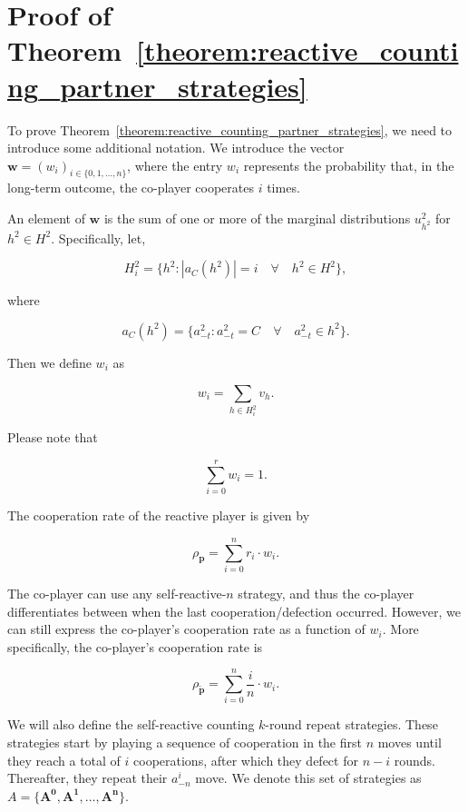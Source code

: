 \documentclass[11pt]{article}
\theoremstyle{plainCl1}
\theoremstyle{plainCl2}
\begin{document}

\section{Proof of Theorem~\ref{theorem:reactive_counting_partner_strategies}}\label{appendix:reactive_counting_n_akin_generalized}


To prove Theorem~\ref{theorem:reactive_counting_partner_strategies}, we need
to introduce some additional notation. We introduce the vector $\mathbf{w} =
(w_i)_{i \in \{0, 1, \dots, n\}}$, where the entry $w_i$ represents the
probability that, in the long-term outcome, the co-player cooperates $i$ times.

An element of $\mathbf{w}$ is the sum of one or more of the marginal
distributions $u^2_{h^2}$ for $h^2 \in H^2$. Specifically, let,

$$
H^2_{i} = \{h^2 : |a_{C}(h^2)| = i \quad \forall \quad h^2 \in H^2\},
$$

where

$$
a_{C}(h^2) = \{a^2_{-t} : a^2_{-t} = C \quad \forall \quad a^2_{-t} \in h^2\}.
$$

Then we define $w_i$ as

$$
w_{i} = \sum_{h \in H^2_{i}} v_{h}.
$$

Please note that

\begin{equation}\label{Eq:normalization_counting}
  \sum_{i=0}^{r} w_i = 1.
\end{equation}

The cooperation rate of the reactive player is given by

\begin{equation}\label{Eq:player_cooperation_counting}
  \rho_{\mathbf{p}} = \sum_{i=0}^{n} r_{i} \cdot w_{i}.
\end{equation}

The co-player can use any self-reactive-$n$ strategy, and thus the co-player
differentiates between when the last cooperation/defection occurred. However, we
can still express the co-player's cooperation rate as a function of $w_{i}$.
More specifically, the co-player's cooperation rate is

\begin{equation}\label{Eq:coplayer_cooperation_counting}
  \rho_{\mathbf{\tilde{p}}} = \sum_{i=0}^{n} \frac{i}{n} \cdot w_{i}.
\end{equation}

We will also define the self-reactive counting $k$-round repeat strategies.
These strategies start by playing a sequence of cooperation in the first $n$
moves until they reach a total of $i$ cooperations, after which they defect for
$n-i$ rounds. Thereafter, they repeat their $a^{i}_{-n}$ move.
We denote this set of strategies as $A =\{\mathbf{A^{0}},
\mathbf{A^{1}}, \dots, \mathbf{A^{n}} \}$.
\end{document}
